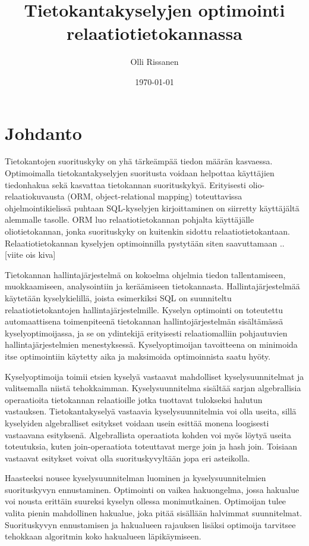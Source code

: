 \documentclass[finnish]{tktltiki2}
\title{Tietokantakyselyjen optimointi relaatiotietokannassa}
\author{Olli Rissanen}
\date{\today}
\theoremstyle{definition}
\theoremstyle{remark}
\begin{document}

\maketitle
\makeabstract
\tableofcontents
\newpage



\section{Johdanto}
Tietokantojen suorituskyky on yhä tärkeämpää tiedon määrän kasvaessa. Optimoimalla tietokantakyselyjen suoritusta voidaan helpottaa käyttäjien tiedonhakua sekä kasvattaa tietokannan suorituskykyä.\cite{mor2012} Erityisesti olio-relaatiokuvausta (ORM, object-relational mapping) toteuttavissa ohjelmointikielissä puhtaan SQL-kyselyjen kirjoittaminen on siirretty käyttäjältä alemmalle tasolle. ORM luo relaatiotietokannan pohjalta käyttäjälle oliotietokannan, jonka suorituskyky on kuitenkin sidottu relaatiotietokantaan. Relaatiotietokannan kyselyjen optimoinnilla pystytään siten saavuttamaan .. [viite ois kiva]

Tietokannan hallintajärjestelmä on kokoelma ohjelmia tiedon tallentamiseen, muokkaamiseen, analysointiin ja keräämiseen tietokannasta. Hallintajärjestelmää käytetään kyselykielillä, joista esimerkiksi SQL on suunniteltu relaatiotietokantojen hallintajärjestelmille. Kyselyn optimointi on toteutettu automaattisena toimenpiteenä tietokannan hallintojärjestelmän sisältämässä kyselyoptimoijassa, ja se on ydintekijä erityisesti relaatiomalliin pohjautuvien hallintajärjestelmien menestyksessä. Kyselyoptimoijan tavoitteena on minimoida itse optimointiin käytetty aika ja maksimoida optimoinnista saatu hyöty.\cite{jarke1984} 

Kyselyoptimoija toimii etsien kyselyä vastaavat mahdolliset kyselysuunnitelmat ja valitsemalla niistä tehokkaimman. Kyselysuunnitelma sisältää sarjan algebrallisia operaatioita tietokannan relaatioille jotka tuottavat tulokseksi halutun vastauksen. Tietokantakyselyä vastaavia kyselysuunnitelmia voi olla useita, sillä kyselyiden algebralliset esitykset voidaan usein esittää monena loogisesti vastaavana esityksenä. Algebrallista operaatiota kohden voi myös löytyä useita toteutuksia, kuten join-operaatiota toteuttavat merge join ja hash join. Toisiaan vastaavat esitykset voivat olla suorituskyvyltään jopa eri asteikolla.

Haasteeksi nousee kyselysuunnitelman luominen ja kyselysuunnitelmien suorituskyvyn ennustaminen. Optimointi on vaikea hakuongelma, jossa hakualue voi nousta erittäin suureksi kyselyn ollessa monimutkainen.\cite{chaudhuri1998} Optimoijan tulee valita pienin mahdollinen hakualue, joka pitää sisällään halvimmat suunnitelmat. Suorituskyvyn ennustamisen ja hakualueen rajauksen lisäksi optimoija tarvitsee tehokkaan algoritmin koko hakualueen läpikäymiseen.
\end{document}
